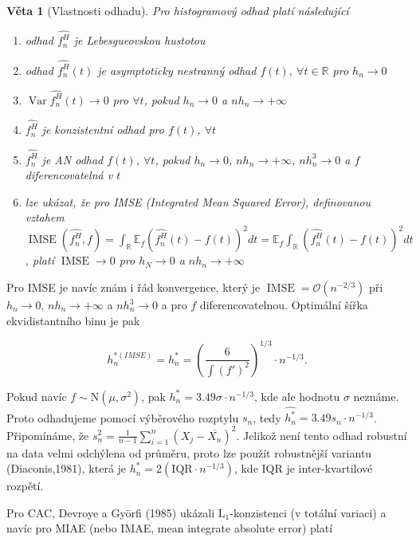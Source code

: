 \documentclass{article}
\newtheorem{theorem}[subsubsection]{Věta}
\theoremstyle{remark}
\theoremstyle{plain}
\theoremstyle{definition}
\theoremstyle{remark}
\begin{document}
\begin{theorem}[Vlastnosti odhadu]
Pro histogramový odhad platí následující
\begin{enumerate}
    \item odhad $\hat{f_n^H}$ je Lebesgueovskou hustotou
    \item odhad $\hat{f_n^H}(t)$ je asymptoticky nestranný odhad $f(t), \ \forall t \in \mathbb{R}$ pro $h_n \rightarrow 0$
    \item $\operatorname{Var} \hat{f_n^H}(t) \rightarrow 0$ pro $\forall t$, pokud $h_n \rightarrow 0$ a $nh_n \rightarrow +\infty$
    \item $\hat{f_n^H}$ je konzistentní odhad pro $f(t)$, $\forall t$
    \item $\hat{f_n^H}$ je AN odhad $f(t)$, $\forall t$, pokud $h_n \rightarrow 0$, $nh_n \rightarrow +\infty$, $nh_n^3 \rightarrow 0$ a $f$ diferencovatelná v $t$
    \item lze ukázat, že pro IMSE (Integrated Mean Squared Error), definovanou vztahem \\ $\operatorname{IMSE}(\hat{f_n^H},f) = \int_{\mathbb{R}} \mathbb{E}_f(\hat{f_n^H}(t)-f(t))^2 dt = \mathbb{E}_f \int_{\mathbb{R}} (\hat{f_n^H}(t)-f(t))^2 dt$, platí $\operatorname{IMSE} \rightarrow 0$ pro $h_N \rightarrow 0$ a $nh_n \rightarrow +\infty$
\end{enumerate}
\end{theorem}

Pro IMSE je navíc znám i řád konvergence, který je $\operatorname{IMSE} = \mathcal{O}(n^{-2/3})$ při $h_n \rightarrow 0$, $nh_n \rightarrow +\infty$ a $nh_n^3 \rightarrow 0$ a pro $f$ diferencovatelnou. Optimální šířka ekvidistantního binu je pak

$$
h_n^{*(IMSE)} = h_n^* = \left(
\frac{6}{\int (f')^2}\right)^{1/3} \cdot n^{-1/3}.
$$

Pokud navíc $f \sim \text{N}(\mu,\sigma^2)$, pak $h_n^* = 3.49\sigma \cdot n^{-1/3}$, kde ale hodnotu $\sigma$ neznáme. Proto odhadujeme pomocí výběrového rozptylu $s_n$, tedy $\hat{h_n^*} = 3.49 s_n \cdot n^{-1/3}$. Připomínáme, že $s_n^2 = \frac{1}{n-1} \sum_{i=1}^n (X_j - \overline{X_n})^2$. Jelikož není tento odhad robustní na data velmi odchýlena od průměru, proto lze použít robustnější variantu (Diaconis,1981), která je $h_n^* = 2(\text{IQR} \cdot n^{-1/3})$, kde IQR je inter-kvartilové rozpětí. \newline

Pro CAC, Devroye a Gy\"orfi (1985) ukázali $\text{L}_1$-konzistenci (v totální variaci) a navíc pro MIAE (nebo IMAE, mean integrate absolute error) platí
\end{document}
